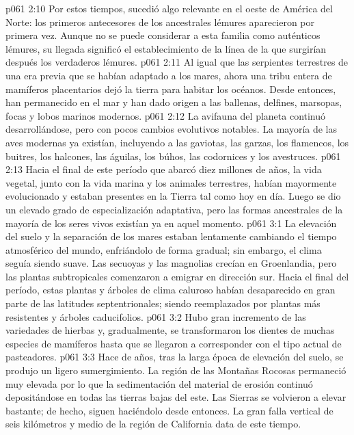 \vs p061 2:10 Por estos tiempos, sucedió algo relevante en el oeste de América del Norte: los primeros antecesores de los ancestrales lémures aparecieron por primera vez. Aunque no se puede considerar a esta familia como auténticos lémures, su llegada significó el establecimiento de la línea de la que surgirían después los verdaderos lémures.
\vs p061 2:11 Al igual que las serpientes terrestres de una era previa que se habían adaptado a los mares, ahora una tribu entera de mamíferos placentarios dejó la tierra para habitar los océanos. Desde entonces, han permanecido en el mar y han dado origen a las ballenas, delfines, marsopas, focas y lobos marinos modernos.
\vs p061 2:12 La avifauna del planeta continuó desarrollándose, pero con pocos cambios evolutivos notables. La mayoría de las aves modernas ya existían, incluyendo a las gaviotas, las garzas, los flamencos, los buitres, los halcones, las águilas, los búhos, las codornices y los avestruces.
\vs p061 2:13 \pc Hacia el final de este período  que abarcó diez millones de años, la vida vegetal, junto con la vida marina y los animales terrestres, habían mayormente evolucionado y estaban presentes en la Tierra tal como hoy en día. Luego se dio un elevado grado de especialización adaptativa, pero las formas ancestrales de la mayoría de los seres vivos existían ya en aquel momento.
\vs p061 3:1 La elevación del suelo y la separación de los mares estaban lentamente cambiando el tiempo atmosférico del mundo, enfriándolo de forma gradual; sin embargo, el clima seguía siendo suave. Las secuoyas y las magnolias crecían en Groenlandia, pero las plantas subtropicales comenzaron a emigrar en dirección sur. Hacia el final del período, estas plantas y árboles de clima caluroso habían desaparecido en gran parte de las latitudes septentrionales; siendo reemplazados por plantas más resistentes y árboles caducifolios.
\vs p061 3:2 Hubo gran incremento de las variedades de hierbas y, gradualmente, se transformaron los dientes de muchas especies de mamíferos hasta que se llegaron a corresponder con el tipo actual de pasteadores.
\vs p061 3:3 \pc Hace  de años, tras la larga época de elevación del suelo, se produjo un ligero sumergimiento. La región de las Montañas Rocosas permaneció muy elevada por lo que la sedimentación del material de erosión continuó depositándose en todas las tierras bajas del este. Las Sierras se volvieron a elevar bastante; de hecho, siguen haciéndolo desde entonces. La gran falla vertical de seis kilómetros y medio de la región de California data de este tiempo.
